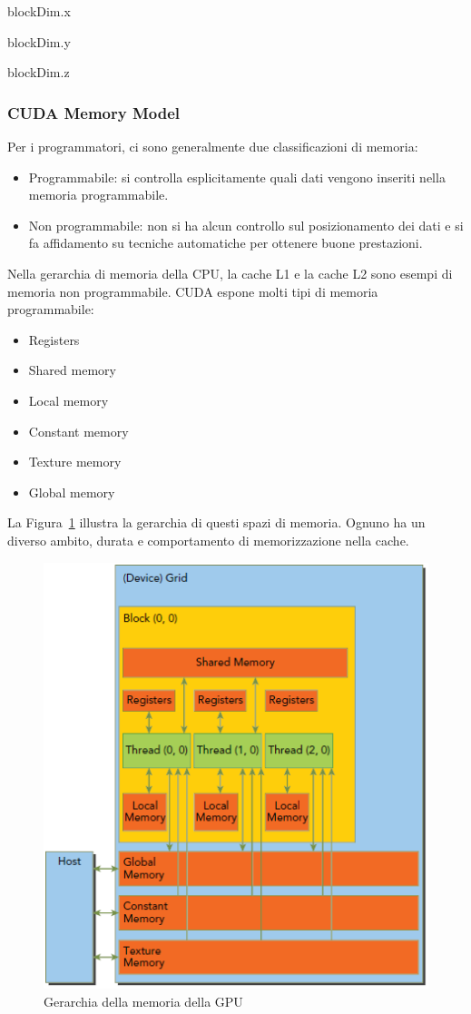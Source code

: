 blockDim.x

blockDim.y

blockDim.z
\subsubsection{CUDA Memory Model}
\label{sec:CUDA Memory Model}
Per i programmatori, ci sono generalmente due classificazioni di memoria:
\begin{itemize}
	\item Programmabile: si controlla esplicitamente quali dati vengono inseriti nella memoria programmabile.
	\item Non programmabile: non si ha alcun controllo sul posizionamento dei dati e si fa affidamento su tecniche automatiche per ottenere buone prestazioni.
\end{itemize}
Nella gerarchia di memoria della CPU, la cache L1 e la cache L2 sono esempi di memoria non programmabile. CUDA espone molti tipi di memoria programmabile:
\begin{itemize}
	\item Registers
	\item Shared memory
	\item Local memory
	\item Constant memory
	\item Texture memory
	\item Global memory
\end{itemize}
La Figura~\ref{fig:GPU_Memory_Hierarchy} illustra la gerarchia di questi spazi di memoria. Ognuno ha un diverso ambito, durata e comportamento di memorizzazione nella cache.
\begin{figure}[h!]
	\centering
	\includegraphics[width=.7\textwidth]{Immagini/CUDA/GPU_Memory_Hierarchy}
	\caption{Gerarchia della memoria della GPU \cite{Cheng:ProfessionalCudaProgramming}}
	\label{fig:GPU_Memory_Hierarchy}
\end{figure}
